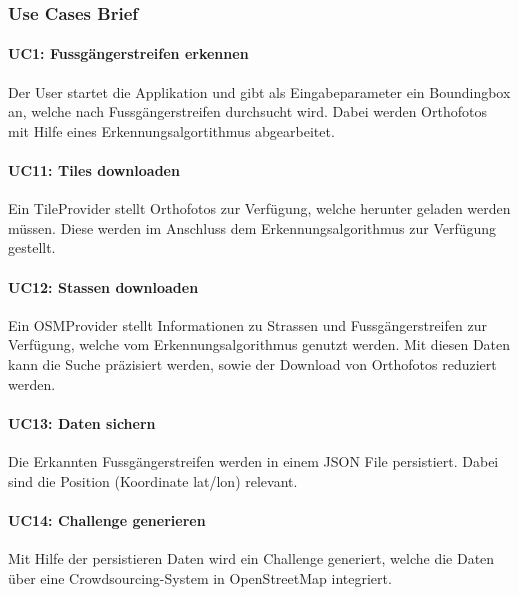 \subsubsection{Use Cases Brief}
\paragraph{UC1: Fussgängerstreifen erkennen}
Der User startet die Applikation und gibt als Eingabeparameter ein Boundingbox an, welche nach Fussgängerstreifen durchsucht wird. Dabei werden Orthofotos mit Hilfe eines Erkennungsalgortithmus abgearbeitet.

\paragraph{UC11: Tiles downloaden} 
Ein TileProvider stellt Orthofotos zur Verfügung, welche herunter geladen werden müssen. Diese werden im Anschluss dem Erkennungsalgorithmus zur Verfügung gestellt.

\paragraph{UC12: Stassen downloaden}
Ein OSMProvider stellt Informationen zu Strassen und Fussgängerstreifen zur Verfügung, welche vom Erkennungsalgorithmus genutzt werden. Mit diesen Daten kann die Suche präzisiert werden, sowie der Download von Orthofotos reduziert werden.

\paragraph{UC13: Daten sichern}
Die Erkannten Fussgängerstreifen werden in einem JSON File persistiert. Dabei sind die Position (Koordinate lat/lon) relevant.

\paragraph{UC14: Challenge generieren}
Mit Hilfe der persistieren Daten wird ein Challenge generiert, welche die Daten über eine Crowdsourcing-System in OpenStreetMap integriert.

